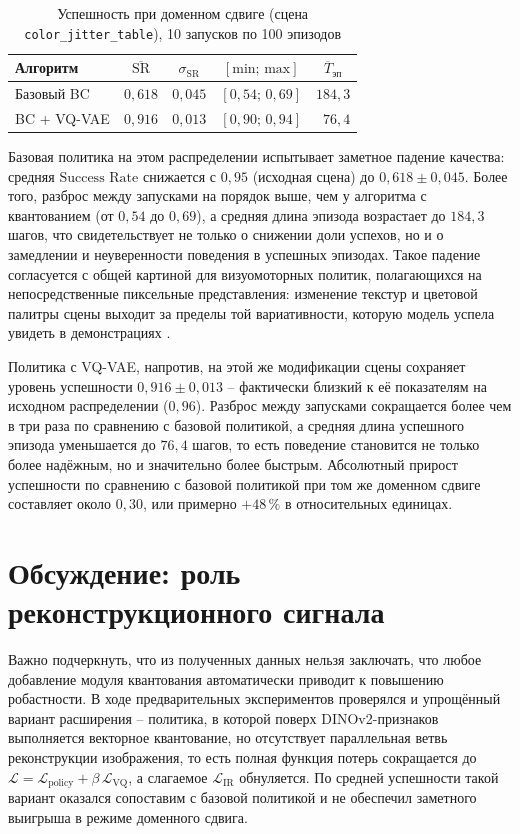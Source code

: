 \begin{table}[h]
\centering
\caption{Успешность при доменном сдвиге (сцена \texttt{color\_jitter\_table}), 10 запусков по 100 эпизодов}
\label{tab:results-ood}
\begin{tabular}{lcccc}
\toprule
Алгоритм & $\overline{\text{SR}}$ & $\sigma_{\text{SR}}$ & $[\text{min};\,\text{max}]$ & $\overline{T}_{\text{эп}}$ \\
\midrule
Базовый BC             & $0{,}618$ & $0{,}045$ & $[0{,}54;\,0{,}69]$ & $184{,}3$ \\
BC + VQ-VAE            & $0{,}916$ & $0{,}013$ & $[0{,}90;\,0{,}94]$ & $\phantom{0}76{,}4$ \\
\bottomrule
\end{tabular}
\end{table}

Базовая политика на этом распределении испытывает заметное падение качества: средняя $\text{Success Rate}$ снижается с $0{,}95$ (исходная сцена) до $0{,}618 \pm 0{,}045$. Более того, разброс между запусками на порядок выше, чем у алгоритма с квантованием (от $0{,}54$ до $0{,}69$), а средняя длина эпизода возрастает до $184{,}3$ шагов, что свидетельствует не только о снижении доли успехов, но и о замедлении и неуверенности поведения в успешных эпизодах. Такое падение согласуется с общей картиной для визуомоторных политик, полагающихся на непосредственные пиксельные представления: изменение текстур и цветовой палитры сцены выходит за пределы той вариативности, которую модель успела увидеть в демонстрациях \cite{mandlekar2021robomimic, yang2023vector}.

Политика с VQ-VAE, напротив, на этой же модификации сцены сохраняет уровень успешности $0{,}916 \pm 0{,}013$ -- фактически близкий к её показателям на исходном распределении ($0{,}96$). Разброс между запусками сокращается более чем в три раза по сравнению с базовой политикой, а средняя длина успешного эпизода уменьшается до $76{,}4$ шагов, то есть поведение становится не только более надёжным, но и значительно более быстрым. Абсолютный прирост успешности по сравнению с базовой политикой при том же доменном сдвиге составляет около $0{,}30$, или примерно $+48\,\%$ в относительных единицах.

\section{Обсуждение: роль реконструкционного сигнала}
\label{sec:results-discussion}

Важно подчеркнуть, что из полученных данных нельзя заключать, что любое добавление модуля квантования автоматически приводит к повышению робастности. В ходе предварительных экспериментов проверялся и упрощённый вариант расширения -- политика, в которой поверх DINOv2-признаков выполняется векторное квантование, но отсутствует параллельная ветвь реконструкции изображения, то есть полная функция потерь сокращается до $\mathcal{L} = \mathcal{L}_{\text{policy}} + \beta\,\mathcal{L}_{\text{VQ}}$, а слагаемое $\mathcal{L}_{\text{IR}}$ обнуляется. По средней успешности такой вариант оказался сопоставим с базовой политикой и не обеспечил заметного выигрыша в режиме доменного сдвига.

